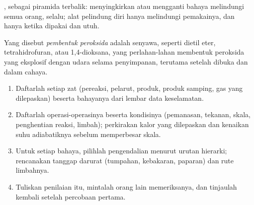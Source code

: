\begin{omfigure}

{\small {}, sebagai piramida terbalik: menyingkirkan atau mengganti
bahaya melindungi semua orang, selalu; alat pelindung diri hanya melindungi
pemakainya, dan hanya ketika dipakai dan utuh.}
\end{omfigure}

\begin{definition}\label{def:b3:lab-techniques-3:peroxide}
Yang disebut \emph{pembentuk peroksida} adalah senyawa, seperti dietil
eter, tetrahidrofuran, atau 1,4-dioksana, yang perlahan-lahan membentuk peroksida yang eksplosif
dengan udara selama penyimpanan, terutama setelah dibuka dan dalam cahaya.
\end{definition}

\begin{method}\label{met:b3:lab-techniques-3:risk-assessment}
\begin{enumerate}
  \item Daftarlah setiap zat (pereaksi, pelarut, produk, produk samping, gas yang
        dilepaskan) beserta bahayanya dari lembar data keselamatan.
  \item Daftarlah operasi-operasinya beserta kondisinya (pemanasan, tekanan, skala,
        penghentian reaksi, limbah); perkirakan kalor yang dilepaskan dan kenaikan suhu adiabatiknya
        sebelum memperbesar skala.
  \item Untuk setiap bahaya, pilihlah pengendalian menurut urutan hierarki; rencanakan tanggap
        darurat (tumpahan, kebakaran, paparan) dan rute limbahnya.
  \item Tuliskan penilaian itu, mintalah orang lain memeriksanya, dan tinjaulah kembali setelah percobaan pertama.
\end{enumerate}
\end{method}

